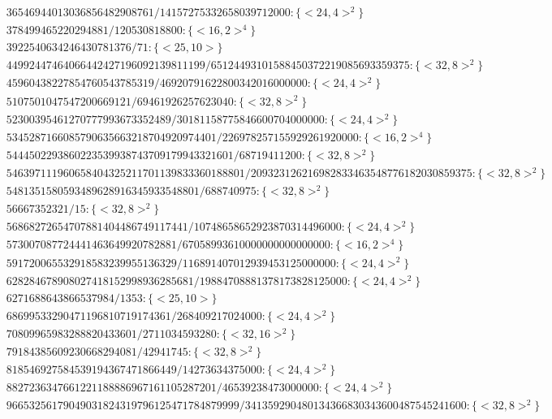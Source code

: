 \documentclass[11pt,reqno]{amsart}
\theoremstyle{plain}
\theoremstyle{definition}
\begin{document}
{\begin{align*}
&36546944013036856482908761/14157275332658039712000:\{ <24, 4>^2 \}\\
&378499465220294881/120530818800:\{ <16, 2>^4 \}\\
&3922540634246430781376/71:\{ <25, 10> \}\\
&44992447464066442427196092139811199/65124493101588450372219085693359375:\{ <32, 8>^2 \}\\
&45960438227854760543785319/46920791622800342016000000:\{ <24, 4>^2 \}\\
&5107501047547200669121/69461926257623040:\{ <32, 8>^2 \}\\
&52300395461270777993673352489/30181158775846600704000000:\{ <24, 4>^2 \}\\
&5345287166085790635663218704920974401/226978257155929261920000:\{ <16, 2>^4 \}
\end{align*}
\begin{align*}
&5444502293860223539938743709179943321601/68719411200:\{ <32, 8>^2 \}\\
&546397111960658404325211701139833360188801/209323126216982833463548776182030859375:\{<32, 8>^2 \}\\
&5481351580593489628916345933548801/688740975:\{ <32, 8>^2 \}\\
&56667352321/15:\{ <32, 8>^2 \}\\
&56868272654707881404486749117441/10748658652923870314496000:\{ <24, 4>^2 \}\\
&573007087724441463649920782881/67058993610000000000000000:\{ <16, 2>^4 \}\\
&591720065532918583239955136329/116891407012939453125000000:\{ <24, 4>^2 \}\\
&628284678908027418152998936285681/19884708881378173828125000:\{ <24, 4>^2 \}\\
&6271688643866537984/1353:\{ <25, 10> \}\\
&68699533290471196810719174361/268409217024000:\{ <24, 4>^2 \}\\
&70809965983288820433601/2711034593280:\{ <32, 16>^2 \}\\
&79184385609230668294081/42941745:\{ <32, 8>^2 \}\\
&818546927584539194367471866449/14273634375000:\{ <24, 4>^2 \}\\
&8827236347661221188886967161105287201/46539238473000000:\{ <24, 4>^2 \}\\
&96653256179049031824319796125471784879999/341359290480134366830343600487545241600:\{ <32, 8>^2 \}
\end{align*}}
\vspace{20 mm}


\end{document}

